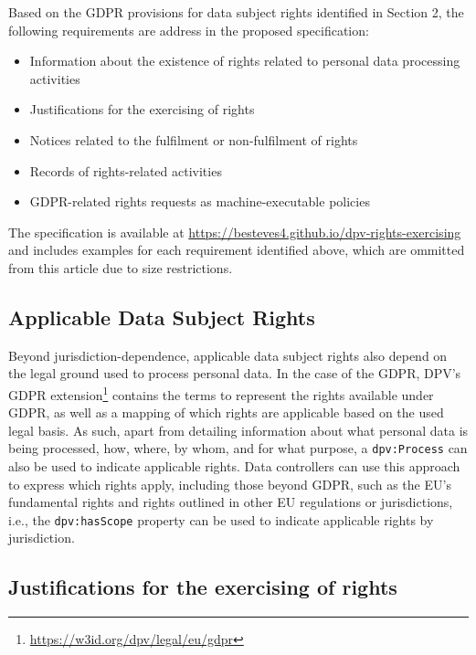 \documentclass{IOS-Book-Article}     %
\begin{document}
Based on the GDPR provisions for data subject rights identified in Section 2, the following requirements are address in the proposed specification:

\begin{itemize}
    \item[\textbf{Section 3.1.}] Information about the existence of rights related to personal data processing activities
    \item[\textbf{Section 3.2.}] Justifications for the exercising of rights
    \item[\textbf{Section 3.3.}] Notices related to the fulfilment or non-fulfilment of rights
    \item[\textbf{Section 3.4.}] Records of rights-related activities
    \item[\textbf{Section 3.5.}] GDPR-related rights requests as machine-executable policies
\end{itemize}

The specification is available at \url{https://besteves4.github.io/dpv-rights-exercising} and includes examples for each requirement identified above, which are ommitted from this article due to size restrictions.

\subsection{Applicable Data Subject Rights}
\label{sec:applicable-rights}

Beyond jurisdiction-dependence, applicable data subject rights also depend on the legal ground used to process personal data.
In the case of the GDPR, DPV's GDPR extension\footnote{\url{https://w3id.org/dpv/legal/eu/gdpr}} contains the terms to represent the rights available under GDPR, as well as a mapping of which rights are applicable based on the used legal basis.
As such, apart from detailing information about what personal data is being processed, how, where, by whom, and for what purpose, a \texttt{dpv:Process} can also be used to indicate applicable rights.
Data controllers can use this approach to express which rights apply, including those beyond GDPR, such as the EU’s fundamental rights and rights outlined in other EU regulations or jurisdictions, i.e., the \texttt{dpv:hasScope} property can be used to indicate applicable rights by jurisdiction.

\subsection{Justifications for the exercising of rights}
\label{sec:justifications}
\end{document}

